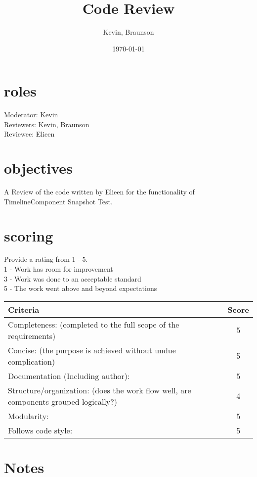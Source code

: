 \documentclass{article}
\title{Code Review}
\author{Kevin, Braunson}
\date{\today}
\begin{document}
\maketitle

\section{roles}
Moderator: Kevin \\
Reviewers: Kevin, Braunson\\
Reviewee: Elieen\\

\section{objectives}
A Review of the code written by Elieen for the functionality of TimelineComponent Snapshot Test. 


\section{scoring}
    Provide a rating from 1 - 5. \\
    1 - Work has room for improvement \\
    3 - Work was done to an acceptable standard \\
    5 - The work went above and beyond expectations\\

\begin{tabular}{|l|c|}
	\hline
	Criteria & Score\\
	\hline
    Completeness:
    (completed to the full scope of the requirements) & 5 \\
	\hline
    Concise:
    (the purpose is achieved without undue complication) & 5 \\
	\hline
    Documentation (Including author): & 5\\
    \hline
    Structure/organization:
    (does the work flow well, are components grouped logically?) & 4\\
    \hline
    Modularity: & 5\\
    \hline
    Follows code style: & 5\\
    \hline
\end{tabular}

\section{Notes}
\end{document}
